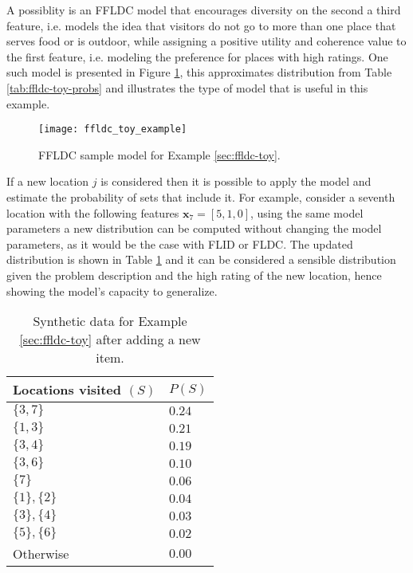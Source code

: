 A possiblity is an FFLDC model that encourages diversity on the second a third feature, i.e. models the idea that visitors do not go to more than one place that serves food or is outdoor, while assigning a positive utility and coherence value to the first feature, i.e. modeling the preference for places with high ratings. One such model is presented in Figure \ref{fig:ffldc-toy-all-weights}, this approximates distribution from Table \ref{tab:ffldc-toy-probs} and illustrates the type of model that is useful in this example.

\begin{figure}
  \centering
  \texttt{[image: ffldc\_toy\_example]}
  \caption{FFLDC sample model for Example \ref{sec:ffldc-toy}.}
  \label{fig:ffldc-toy-all-weights}
\end{figure}

If a new location $j$ is considered then it is possible to apply the model and estimate the probability of sets that include it. For example, consider a seventh location with the following features $\mathbf{x}_{7} = [5, 1, 0]$, using the same model parameters a new distribution can be computed without changing the model parameters, as it would be the case with FLID or FLDC. The updated distribution is shown in Table \ref{tab:ffldc-toy-probs-2} and it can be considered a sensible distribution given the problem description and the high rating of the new location, hence showing the model's capacity to generalize.

\begin{table}
  \centering
  \caption{Synthetic data for Example \ref{sec:ffldc-toy} after adding a new item.}
  \begin{tabular}{@{}ll@{}}
    \toprule
    Locations visited $(S)$ & $P(S)$  \\
    \midrule
    $\{3,7\}$ & $0.24$ \\
    $\{1,3\}$ & $0.21$ \\
    $\{3,4\}$ & $0.19$ \\
    $\{3,6\}$ & $0.10$ \\
    $\{7\}$ & $0.06$ \\
    $\{1\}, \{2\}$ & $0.04$ \\ 
    $\{3\}, \{4\}$ & $0.03$ \\
    $\{5\}, \{6\}$ & $0.02$ \\
    Otherwise & $0.00$ \\
    \bottomrule
  \end{tabular}
  \label{tab:ffldc-toy-probs-2}
\end{table}